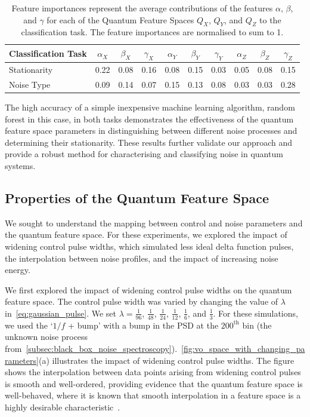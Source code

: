 \documentclass[12pt]{iopart}
\begin{document}
\begin{table}[ht]
    \centering
    \begin{tabular}{|l|c c c|c c c|c c c|}
        \hline
 Classification Task & \(\alpha_X\) & \(\beta_X\) & \(\gamma_X\) & \(\alpha_Y\) & \(\beta_Y\) & \(\gamma_Y\) & \(\alpha_Z\) & \(\beta_Z\) & \(\gamma_Z\) \\ \hline
 Stationarity        & 0.22         & 0.08        & 0.16         & 0.08         & 0.15        & 0.03         & 0.05         & 0.08        & 0.15         \\ \hline
 Noise Type          & 0.09         & 0.14        & 0.07         & 0.15         & 0.13        & 0.08         & 0.03         & 0.03        & 0.28         \\ \hline
    \end{tabular}
    \caption{Feature importances represent the average contributions of the features \(\alpha\), \(\beta\), and \(\gamma\) for each of the Quantum Feature Spaces \(Q_X\), \(Q_Y\), and \(Q_Z\) to the classification task. The feature importances are normalised to sum to 1.}
    \label{tab:feature_importances}
\end{table}

The high accuracy of a simple inexpensive machine learning algorithm, random forest in this case, in both tasks demonstrates the effectiveness of the quantum feature space parameters in distinguishing between different noise processes and determining their stationarity. These results further validate our approach and provide a robust method for characterising and classifying noise in quantum systems.

\subsection{Properties of the Quantum Feature Space \label{subsec:properties_of_vo_parameter_space}}
We sought to understand the mapping between control and noise parameters and the quantum feature space. For these experiments, we explored the impact of widening control pulse widths, which simulated less ideal delta function pulses, the interpolation between noise profiles, and the impact of increasing noise energy.

We first explored the impact of widening control pulse widths on the quantum feature space. The control pulse width was varied by changing the value of $\lambda$ in~\cref{eq:gaussian_pulse}. We set $\lambda = \frac{1}{96}$, $\frac{1}{48}$, $\frac{1}{24}$, $\frac{1}{12}$, $\frac{1}{6}$, and $\frac{1}{3}$. For these simulations, we used the `$1/f$ + bump' with a bump in the PSD at the $200^\mathrm{th}$ bin (the unknown noise process from~\cref{subsec:black_box_noise_spectroscopy}).~\cref{fig:vo_space_with_changing_parameters}(a) illustrates the impact of widening control pulse widths. The figure shows the interpolation between data points arising from widening control pulses is smooth and well-ordered, providing evidence that the quantum feature space is well-behaved, where it is known that smooth interpolation in a feature space is a highly desirable characteristic~\cite{bengio2013representation,radford2015unsupervised,guo2024smooth,higgins2017beta}.
\end{document}
